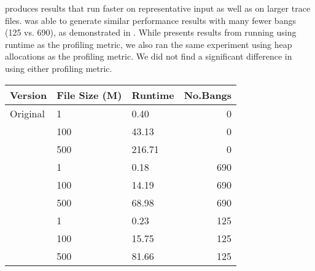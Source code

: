 \Ao{} produces results that run
faster on representative input as well as on larger trace files.
\At{} was able to generate similar performance results with many fewer
bangs (125 vs. 690), as demonstrated in . 
While  presents results from running \At{} using runtime
as the profiling metric, we also ran the same experiment using heap
allocations as the profiling metric. We did not find a significant
difference in using either profiling metric.

\begin{table}
\centering
\begin{tabular}{lllr}
\hline
Version   & File Size (M) & Runtime & No.Bangs \\
\hline
Original      & 1   &   0.40     & 0   \\
          & 100        & 43.13      & 0 \\
       & 500     &  216.71 & 0 \\
\Ao{}       & 1     & 0.18    &  690\\
          & 100        & 14.19 &  690\\
                 & 500        & 68.98   & 690\\
\At{}      & 1   &  0.23 & 125    \\
          & 100        & 15.75 & 125      \\
       & 500    & 81.66 & 125    \\

\hline
\end{tabular}
\label{tab:gc}
\end{table}
